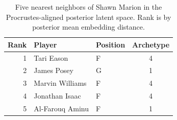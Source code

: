 \begin{table}[htbp]
  \centering\small
  \begin{tabular}{rllc}
    \toprule
    Rank & Player & Position & Archetype \\
    \midrule
    1 & Tari Eason & F & 4 \\
    2 & James Posey & G & 1 \\
    3 & Marvin Williams & F & 4 \\
    4 & Jonathan Isaac & F & 4 \\
    5 & Al-Farouq Aminu & F & 1 \\
    \bottomrule
  \end{tabular}
  \caption{Five nearest neighbors of Shawn Marion in the Procrustes-aligned posterior latent space. Rank is by posterior mean embedding distance.}
  \label{tab:Shawn_Marion_neighbors}
\end{table}

